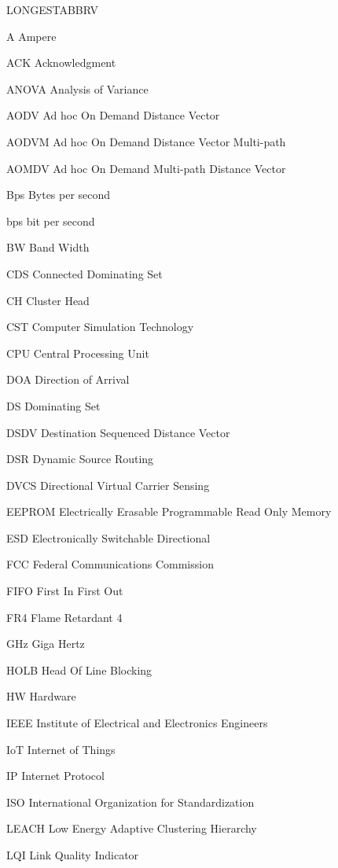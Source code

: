 \begin{theglossary}{LONGESTABBRV}
\item[A] Ampere
\item[ACK] Acknowledgment
\item[ANOVA] Analysis of Variance
\item[AODV] Ad hoc On Demand Distance Vector
\item[AODVM] Ad hoc On Demand Distance Vector Multi-path
\item[AOMDV] Ad hoc On Demand Multi-path Distance Vector
\item[Bps] Bytes per second
\item[bps] bit per second
\item[BW] Band Width
\item[CDS] Connected Dominating Set
\item[CH] Cluster Head
\item[CST] Computer Simulation Technology
\item[CPU] Central Processing Unit
\item[DOA] Direction of Arrival
\item[DS] Dominating Set
\item[DSDV] Destination Sequenced Distance Vector
\item[DSR] Dynamic Source Routing
\item[DVCS] Directional Virtual Carrier Sensing 
\item[EEPROM] Electrically Erasable Programmable Read Only Memory
\item[ESD] Electronically Switchable Directional
\item[FCC] Federal Communications Commission
\item[FIFO] First In First Out
\item[FR4] Flame Retardant 4
\item[GHz] Giga Hertz
\item[HOLB] Head Of Line Blocking
\item[HW] Hardware
\item[IEEE] Institute of Electrical and Electronics Engineers
\item[IoT] Internet of Things
\item[IP] Internet Protocol
\item[ISO] International Organization for Standardization
\item[LEACH] Low Energy Adaptive Clustering Hierarchy
\item[LQI] Link Quality Indicator

\end{theglossary}
